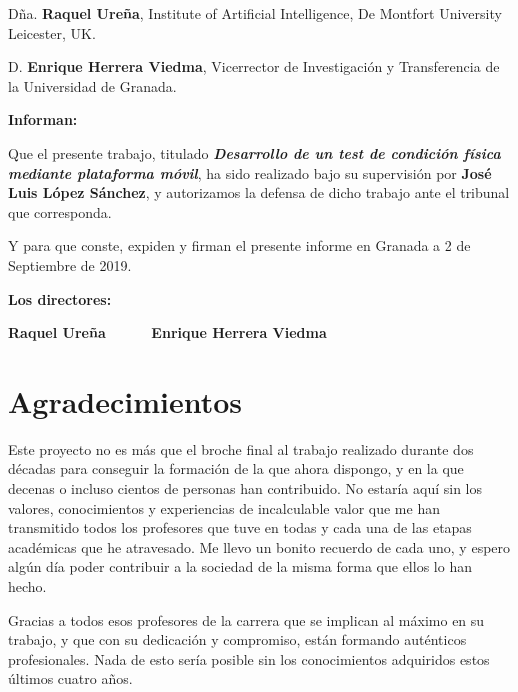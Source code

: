 Dña. \textbf{Raquel Ureña}, Institute of Artificial Intelligence, De Montfort University Leicester, UK.

\vspace{0.5cm}

D. \textbf{Enrique Herrera Viedma}, Vicerrector de Investigación y Transferencia de la Universidad de Granada.


\vspace{0.5cm}

\textbf{Informan:}

\vspace{0.5cm}

Que el presente trabajo, titulado \textit{\textbf{Desarrollo de un test de condición física mediante plataforma móvil}}, ha sido realizado bajo su supervisión por \textbf{José Luis López Sánchez}, y autorizamos la defensa de dicho trabajo ante el tribunal
que corresponda.

\vspace{0.5cm}

Y para que conste, expiden y firman el presente informe en Granada a 2 de Septiembre de 2019.

\vspace{1cm}

\textbf{Los directores:}

\vspace{5cm}

\noindent \textbf{Raquel Ureña \ \ \ \ \ Enrique Herrera Viedma}

\chapter*{Agradecimientos}
\thispagestyle{empty}

       \vspace{1cm}


Este proyecto no es más que el broche final al trabajo realizado durante dos décadas para conseguir la formación de la que ahora dispongo, y en la que decenas o incluso cientos de personas han contribuido. No estaría aquí sin los valores, conocimientos y experiencias de incalculable valor que me han transmitido todos los profesores que tuve en todas y cada una de las etapas académicas que he atravesado. Me llevo un bonito recuerdo de cada uno, y espero algún día poder contribuir a la sociedad de la misma forma que ellos lo han hecho.

Gracias a todos esos profesores de la carrera que se implican al máximo en su trabajo, y que con su dedicación y compromiso, están formando auténticos profesionales. Nada de esto sería posible sin los conocimientos adquiridos estos últimos cuatro años.

